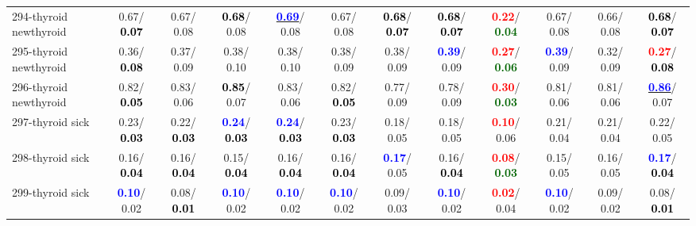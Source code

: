\begin{table}[h]
\begin{center}
{\begin{tabular}{lc|c|c|c|c|c|c|c|c|c|c}
294-thyroid newthyroid &   0.67/\textcolor{black}{\textbf{  0.07}} &   0.67/  0.08 & \textcolor{black}{\textbf{  0.68}}/  0.08 & \underline{\textcolor{blue}{\textbf{  0.69}}}/  0.08 &   0.67/  0.08 & \textcolor{black}{\textbf{  0.68}}/\textcolor{black}{\textbf{  0.07}} & \textcolor{black}{\textbf{  0.68}}/\textcolor{black}{\textbf{  0.07}} & \textcolor{red}{\textbf{  0.22}}/\textcolor{darkgreen}{\textbf{  0.04}} &   0.67/  0.08 &   0.66/  0.08 & \textcolor{black}{\textbf{  0.68}}/\textcolor{black}{\textbf{  0.07}} \\
295-thyroid newthyroid &   0.36/\textcolor{black}{\textbf{  0.08}} &   0.37/  0.09 &   0.38/  0.10 &   0.38/  0.10 &   0.38/  0.09 &   0.38/  0.09 & \textcolor{blue}{\textbf{  0.39}}/  0.09 & \textcolor{red}{\textbf{  0.27}}/\textcolor{darkgreen}{\textbf{  0.06}} & \textcolor{blue}{\textbf{  0.39}}/  0.09 &   0.32/  0.09 & \textcolor{red}{\textbf{  0.27}}/\textcolor{black}{\textbf{  0.08}} \\ \hline
296-thyroid newthyroid &   0.82/\textcolor{black}{\textbf{  0.05}} &   0.83/  0.06 & \textcolor{black}{\textbf{  0.85}}/  0.07 &   0.83/  0.06 &   0.82/\textcolor{black}{\textbf{  0.05}} &   0.77/  0.09 &   0.78/  0.09 & \textcolor{red}{\textbf{  0.30}}/\textcolor{darkgreen}{\textbf{  0.03}} &   0.81/  0.06 &   0.81/  0.06 & \underline{\textcolor{blue}{\textbf{  0.86}}}/  0.07 \\
297-thyroid sick &   0.23/\textcolor{black}{\textbf{  0.03}} &   0.22/\textcolor{black}{\textbf{  0.03}} & \textcolor{blue}{\textbf{  0.24}}/\textcolor{black}{\textbf{  0.03}} & \textcolor{blue}{\textbf{  0.24}}/\textcolor{black}{\textbf{  0.03}} &   0.23/\textcolor{black}{\textbf{  0.03}} &   0.18/  0.05 &   0.18/  0.05 & \textcolor{red}{\textbf{  0.10}}/  0.06 &   0.21/  0.04 &   0.21/  0.04 &   0.22/  0.05 \\
298-thyroid sick &   0.16/\textcolor{black}{\textbf{  0.04}} &   0.16/\textcolor{black}{\textbf{  0.04}} &   0.15/\textcolor{black}{\textbf{  0.04}} &   0.16/\textcolor{black}{\textbf{  0.04}} &   0.16/\textcolor{black}{\textbf{  0.04}} & \textcolor{blue}{\textbf{  0.17}}/  0.05 &   0.16/\textcolor{black}{\textbf{  0.04}} & \textcolor{red}{\textbf{  0.08}}/\textcolor{darkgreen}{\textbf{  0.03}} &   0.15/  0.05 &   0.16/  0.05 & \textcolor{blue}{\textbf{  0.17}}/\textcolor{black}{\textbf{  0.04}} \\
299-thyroid sick & \textcolor{blue}{\textbf{  0.10}}/  0.02 &   0.08/\textcolor{black}{\textbf{  0.01}} & \textcolor{blue}{\textbf{  0.10}}/  0.02 & \textcolor{blue}{\textbf{  0.10}}/  0.02 & \textcolor{blue}{\textbf{  0.10}}/  0.02 &   0.09/  0.03 & \textcolor{blue}{\textbf{  0.10}}/  0.02 & \textcolor{red}{\textbf{  0.02}}/  0.04 & \textcolor{blue}{\textbf{  0.10}}/  0.02 &   0.09/  0.02 &   0.08/\textcolor{black}{\textbf{  0.01}} \\

\end{tabular}}
\end{center}
\end{table}
